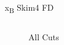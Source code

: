 \documentclass[aspectratio=169]{beamer}
\begin{document}
\begin{frame}{x\textsubscript{B}  \hfill Skim4 FD}
\begin{columns}
\begin{figure}
        \caption{All Cuts}
    \end{figure}
    \end{columns}
\end{frame}
\end{document}
